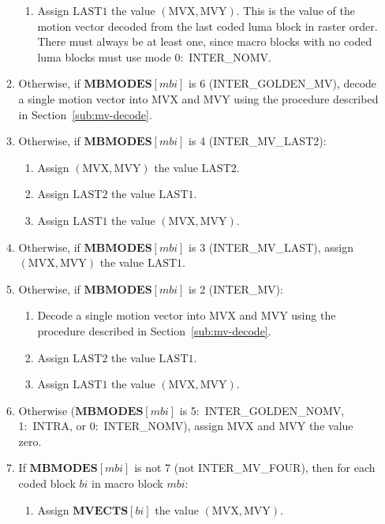 \documentclass[9pt,letterpaper]{book}
\newcommand{\idx}[1]{{\ensuremath{\mathit{#1}}}}
\newcommand{\bi}{\idx{bi}}
\newcommand{\mbi}{\idx{mbi}}
\newcommand{\bitvar}[1]{\ensuremath{\mathbf{\bm{#1}}}}
\newcommand{\locvar}[1]{\ensuremath{\mathrm{#1}}}
\numberwithin{equation}{chapter}
\numberwithin{figure}{chapter}
\numberwithin{table}{chapter}
\begin{document}
\begin{enumerate}
\begin{enumerate}
\begin{enumerate}
\item
Assign \locvar{LAST1} the value $(\locvar{MVX},\locvar{MVY})$.
This is the value of the motion vector decoded from the last coded luma block
 in raster order.
There must always be at least one, since macro blocks with no coded luma blocks
 must use mode 0:~INTER\_NOMV.
\end{enumerate}
\item
Otherwise, if $\bitvar{MBMODES}[\locvar{\mbi}]$ is 6 (INTER\_GOLDEN\_MV),
 decode a single motion vector into \locvar{MVX} and \locvar{MVY} using the
 procedure described in Section~\ref{sub:mv-decode}.
\item
Otherwise, if $\bitvar{MBMODES}[\locvar{\mbi}]$ is 4 (INTER\_MV\_LAST2):
\begin{enumerate}
\item
Assign $(\locvar{MVX},\locvar{MVY})$ the value \locvar{LAST2}.
\item
Assign \locvar{LAST2} the value \locvar{LAST1}.
\item
Assign \locvar{LAST1} the value $(\locvar{MVX},\locvar{MVY})$.
\end{enumerate}
\item
Otherwise, if $\bitvar{MBMODES}[\locvar{\mbi}]$ is 3 (INTER\_MV\_LAST), assign
 $(\locvar{MVX},\locvar{MVY})$ the value \locvar{LAST1}.
\item
Otherwise, if $\bitvar{MBMODES}[\locvar{\mbi}]$ is 2 (INTER\_MV):
\begin{enumerate}
\item
Decode a single motion vector into \locvar{MVX} and \locvar{MVY} using the
 procedure described in Section~\ref{sub:mv-decode}.
\item
Assign \locvar{LAST2} the value \locvar{LAST1}.
\item
Assign \locvar{LAST1} the value $(\locvar{MVX},\locvar{MVY})$.
\end{enumerate}
\item
Otherwise ($\bitvar{MBMODES}[\locvar{\mbi}]$ is 5:~INTER\_GOLDEN\_NOMV,
 1:~INTRA, or 0:~INTER\_NOMV), assign \locvar{MVX} and \locvar{MVY} the value
 zero.
\item
If $\bitvar{MBMODES}[\locvar{\mbi}]$ is not 7 (not INTER\_MV\_FOUR), then for
 each coded block \locvar{\bi} in macro block \locvar{\mbi}:
\begin{enumerate}
\item
Assign $\bitvar{MVECTS}[\locvar{\bi}]$ the value $(\locvar{MVX},\locvar{MVY})$.
\end{enumerate}
\end{enumerate}
\end{enumerate}
\end{document}
